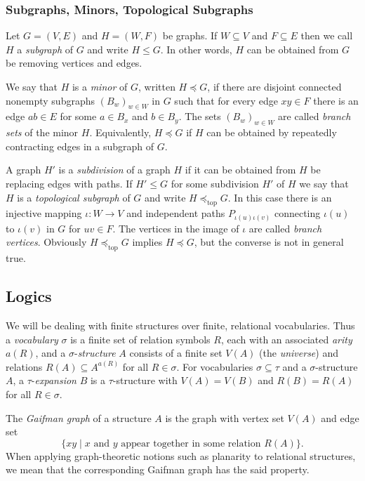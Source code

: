\documentclass[12pt]{amsart}
\newcommand{\suchthat}{\mathbin |}
\newcommand{\topmin}{\preceq_{\mathrm{top}}}
\begin{document}
\subsubsection*{Subgraphs, Minors, Topological Subgraphs}

Let $G = (V,E)$ and $H = (W,F)$ be graphs. If $W \subseteq V$ and $F
\subseteq E$ then we call $H$ a \emph{subgraph} of $G$ and write $H
\leq G$. In other words, $H$ can be obtained from $G$ be removing
vertices and edges.

We say that $H$ is a \emph{minor} of $G$, written $H \preceq G$, if
there are disjoint connected nonempty subgraphs $(B_w)_{w \in W}$ in
$G$ such that for every edge $xy \in F$ there is an edge $ab \in E$
for some $a \in B_x$ and $b \in B_y$. The sets $(B_w)_{w \in W}$ are
called \emph{branch sets} of the minor $H$. Equivalently, $H \preceq
G$ if $H$ can be obtained by repeatedly contracting edges in a
subgraph of $G$.

A graph $H'$ is a \emph{subdivision} of a graph $H$ if it can be
obtained from $H$ be replacing edges with paths. If $H' \leq G$ for
some subdivision $H'$ of $H$ we say that $H$ is a \emph{topological
  subgraph} of $G$ and write $H \topmin G$. In this case there is an
injective mapping $\iota : W \to V$ and independent paths
$P_{\iota(u)\iota(v)}$ connecting $\iota(u)$ to $\iota(v)$ in $G$ for
$uv \in F$. The vertices in the image of $\iota$ are called
\emph{branch vertices}. Obviously $H \topmin G$ implies $H \preceq G$,
but the converse is not in general true.


\subsection{Logics}
\label{sec:logicprelim}

We will be dealing with finite structures over finite, relational
vocabularies. Thus a \emph{vocabulary} $\sigma$ is a finite set of
relation symbols $R$, each with an associated \emph{arity} $a(R)$, and
a $\sigma$-\emph{structure} $A$ consists of a finite set $V(A)$ (the
\emph{universe}) and relations $R(A) \subseteq A^{a(R)}$ for all $R
\in \sigma$. For vocabularies $\sigma \subseteq \tau$ and a
$\sigma$-structure $A$, a $\tau$-\emph{expansion} $B$ is a
$\tau$-structure with $V(A) = V(B)$ and $R(B) = R(A)$ for all $R \in
\sigma$.

The \emph{Gaifman graph} of a structure $A$ is the graph with vertex
set $V(A)$ and edge set
\[
\{ xy \suchthat x\text{ and }y\text{ appear together in some relation }R(A) \}.
\]
When applying graph-theoretic notions such as planarity to relational
structures, we mean that the corresponding Gaifman graph has the said
property.
\end{document}
